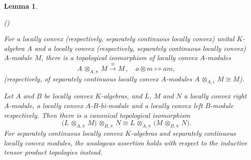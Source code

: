 \documentclass[a4paper, reqno, 10pt]{amsart}
\newtheorem{lemma}[theorem]{Lemma}
\theoremstyle{definition}
\newenvironment{altenumerate}
	{\begin{list}
		{\textup{(\theenumi)} }
		{\usecounter{enumi}
			\setlength{\labelwidth}{0pt}
			\setlength{\labelsep}{0pt}
			\setlength{\leftmargin}{0pt}
			\setlength{\itemsep}{0pt}
			\setlength{\topsep}{0pt}
		\renewcommand{\theenumi}{\roman{enumi}}
		}}
	{\end{list}}
\numberwithin{equation}{section}
\newcommand{\botimes}[1]{{\,\otimes_{#1}\,}}
\newcommand{\lra}{\longrightarrow}
\newcommand{\lto}{\longmapsto}
\begin{document}
\begin{lemma}\label{Lemma 1 - Tensor identities for modules over locally convex algebras}
	\begin{altenumerate}
		\item
		For a locally convex (respectively, separately continuous locally convex) unital $K$-algebra $A$ and a locally convex (respectively, separately continuous locally convex) $A$-module $M$, there is a topological isomorphism of locally convex $A$-modules
		\begin{equation*}
			A \botimes{A,\pi} M \overset{\cong}{\lra} M \,,\quad a \otimes m \lto am ,
		\end{equation*}
		(respectively, of separately continuous locally convex $A$-modules $A \botimes{A,\iota} M \cong M$).
		\item
		Let $A$ and $B$ be locally convex $K$-algebras, and $L$, $M$ and $N$ a locally convex right $A$-module, a locally convex $A$-$B$-bi-module and a locally convex left $B$-module respectively.
		Then there is a canonical topological isomorphism
		\begin{equation*}
			\big( L \botimes{A,\pi} M \big) \botimes{B,\pi} N \cong L \botimes{A,\pi} \big( M \botimes{B,\pi} N \big) .
		\end{equation*}
		For separately continuous locally convex $K$-algebras and separately continuous locally convex modules, the analogous assertion holds with respect to the inductive tensor product topologies instead.
	\end{altenumerate}
\end{lemma}
\end{document}
